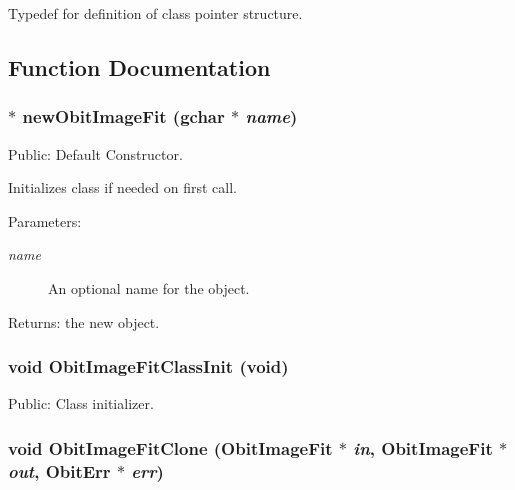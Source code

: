 Typedef for definition of class pointer structure. 



\subsection{Function Documentation}
\subsubsection{$\ast$ new\-Obit\-Image\-Fit (gchar $\ast$ {\em name})}\label{ObitImageFit_8h_a6}


Public: Default Constructor. 

Initializes class if needed on first call. \begin{Desc}
\item[Parameters:]
\begin{description}
\item[{\em name}]An optional name for the object. \end{description}
\end{Desc}
\begin{Desc}
\item[Returns:]the new object. \end{Desc}
\subsubsection{\setlength{\rightskip}{0pt plus 5cm}void Obit\-Image\-Fit\-Class\-Init (void)}\label{ObitImageFit_8h_a5}


Public: Class initializer. 

\subsubsection{\setlength{\rightskip}{0pt plus 5cm}void Obit\-Image\-Fit\-Clone ({\bf Obit\-Image\-Fit} $\ast$ {\em in}, {\bf Obit\-Image\-Fit} $\ast$ {\em out}, {\bf Obit\-Err} $\ast$ {\em err})}\label{ObitImageFit_8h_a11}


